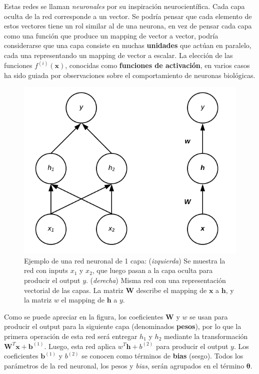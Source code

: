 Estas redes se llaman \textit{neuronales} por su inspiraci\'on neurocient\'ifica. Cada capa oculta de la red corresponde a un vector. Se podr\'ia pensar que cada elemento de estos vectores tiene un rol similar al de una neurona, en vez de pensar cada capa como una funci\'on que produce un mapping de vector a vector, podr\'ia considerarse que una capa consiste en muchas \textbf{unidades} que act\'uan en paralelo, cada una representando un mapping de vector a escalar. La elecci\'on de las funciones $f^{(i)}(\bm{x})$, conocidas como \textbf{funciones de activaci\'on}, en varios casos ha sido guiada por observaciones sobre el comportamiento de neuronas biol\'ogicas.

\begin{figure}[H]
\captionsetup{font=small,labelfont=small}
\caption{Ejemplo de una red neuronal de 1 capa: (\textit{izquierda}) Se muestra la red con inputs $x_1$ y $x_2$, que luego pasan a la capa oculta para producir el output $y$. (\textit{derecha}) Misma red con una representaci\'on vectorial de las capas. La matriz ${\bm{W}}$ describe el mapping de ${\bm{x}}$ a ${\bm{h}}$, y la matriz $w$ el mapping de ${\bm{h}}$ a $y$.}
\centering
\includegraphics[scale=.5]{img/F1NN1L.png}
\end{figure}

Como se puede apreciar en la figura, los coeficientes ${\bm{W}}$ y $w$ se usan para producir el output para la siguiente capa (denominados \textbf{pesos}), por lo que la primera operaci\'on de esta red ser\'a entregar $h_{1}$ y $h_{2}$ mediante la transformaci\'on ${\bm{W}^{T}}\bm{x} + \bm{b}^{(1)}$. Luego, esta red aplica $w^{T} \boldsymbol{h} + b^{(2)}$ para producir el output $y$. Los coeficientes $\bm{b}^{(1)}$ y  $b^{(2)}$ se conocen como t\'erminos de \textbf{bias} (sesgo). Todos los parámetros de la red neuronal, los pesos y \textit{bias}, serán agrupados en el t\'ermino $\bm{\theta}$.


